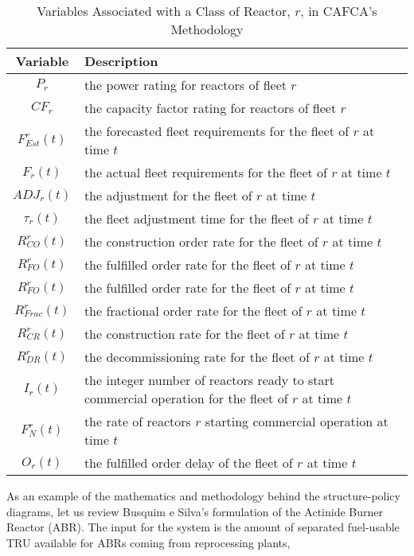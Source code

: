 \begin{table} [h!]
\centering
\begin{tabularx}{\textwidth-20pt}{|c|X|} %
\hline
Variable    & Description \\
\hline
$P_r$            & the power rating for reactors of fleet $r$ \\
$CF_r$           & the capacity factor rating for reactors of fleet $r$ \\
$F^r_{Est}(t)$   & the forecasted fleet requirements for the fleet of $r$ at time $t$  \\
$F_r(t)$         & the actual fleet requirements for the fleet of $r$ at time $t$  \\
$ADJ_r(t)$       & the adjustment for the fleet of $r$ at time $t$  \\
$\tau_r(t)$      & the fleet adjustment time for the fleet of $r$ at time $t$  \\
$R^r_{CO}(t)$    & the construction order rate for the fleet of $r$ at time $t$  \\
$R^r_{FO}(t)$    & the fulfilled order rate for the fleet of $r$ at time $t$  \\
$R^r_{FO}(t)$    & the fulfilled order rate for the fleet of $r$ at time $t$  \\
$R^r_{Frac}(t)$  & the fractional order rate for the fleet of $r$ at time $t$  \\
$R^r_{CR}(t)$    & the construction rate for the fleet of $r$ at time $t$  \\
$R^r_{DR}(t)$    & the decommissioning rate for the fleet of $r$ at time $t$  \\
$I_r(t)$         & the integer number of reactors ready to start commercial operation for the fleet of $r$ at time $t$  \\
$F^r_N(t)$       & the rate of reactors $r$ starting commercial operation at time $t$ \\
$O_r(t)$         & the fulfilled order delay of the fleet of $r$ at time $t$ \\
\hline
\end{tabularx}
\caption{Variables Associated with a Class of Reactor, $r$, in CAFCA's Methodology}
\label{tbl:cafca-rxtr-vars}
\end{table}

As an example of the mathematics and methodology behind the structure-policy
diagrams, let us review Busquim e Silva's formulation of the Actinide Burner
Reactor (ABR)\cite{busquim_e_silva_system_2008}. The input for the system is the
amount of separated fuel-usable TRU available for ABRs coming from reprocessing
plants,

